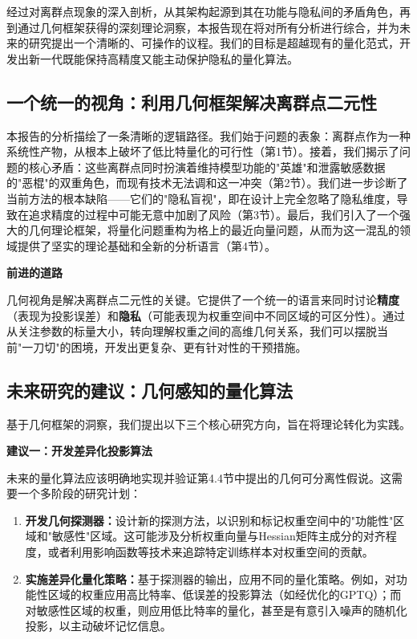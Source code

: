 \documentclass[letterpaper,twocolumn,10pt]{article}
\begin{document}
经过对离群点现象的深入剖析，从其架构起源到其在功能与隐私间的矛盾角色，再到通过几何框架获得的深刻理论洞察，本报告现在将对所有分析进行综合，并为未来的研究提出一个清晰的、可操作的议程。我们的目标是超越现有的量化范式，开发出新一代既能保持高精度又能主动保护隐私的量化算法。

\subsection{一个统一的视角：利用几何框架解决离群点二元性}

本报告的分析描绘了一条清晰的逻辑路径。我们始于问题的表象：离群点作为一种系统性产物，从根本上破坏了低比特量化的可行性（第1节）。接着，我们揭示了问题的核心矛盾：这些离群点同时扮演着维持模型功能的"英雄"和泄露敏感数据的"恶棍"的双重角色，而现有技术无法调和这一冲突（第2节）。我们进一步诊断了当前方法的根本缺陷——它们的"隐私盲视"，即在设计上完全忽略了隐私维度，导致在追求精度的过程中可能无意中加剧了风险（第3节）。最后，我们引入了一个强大的几何理论框架，将量化问题重构为格上的最近向量问题，从而为这一混乱的领域提供了坚实的理论基础和全新的分析语言（第4节）。

\textbf{前进的道路}

几何视角是解决离群点二元性的关键。它提供了一个统一的语言来同时讨论\textbf{精度}（表现为投影误差）和\textbf{隐私}（可能表现为权重空间中不同区域的可区分性）。通过从关注参数的标量大小，转向理解权重之间的高维几何关系，我们可以摆脱当前"一刀切"的困境，开发出更复杂、更有针对性的干预措施。

\subsection{未来研究的建议：几何感知的量化算法}

基于几何框架的洞察，我们提出以下三个核心研究方向，旨在将理论转化为实践。

\textbf{建议一：开发差异化投影算法}

未来的量化算法应该明确地实现并验证第4.4节中提出的几何可分离性假说。这需要一个多阶段的研究计划：

\begin{enumerate}
\item \textbf{开发几何探测器：}设计新的探测方法，以识别和标记权重空间中的"功能性"区域和"敏感性"区域。这可能涉及分析权重向量与Hessian矩阵主成分的对齐程度，或者利用影响函数等技术来追踪特定训练样本对权重空间的贡献。
\item \textbf{实施差异化量化策略：}基于探测器的输出，应用不同的量化策略。例如，对功能性区域的权重应用高比特率、低误差的投影算法（如经优化的GPTQ）；而对敏感性区域的权重，则应用低比特率的量化，甚至是有意引入噪声的随机化投影，以主动破坏记忆信息。
\end{enumerate}
\end{document}
